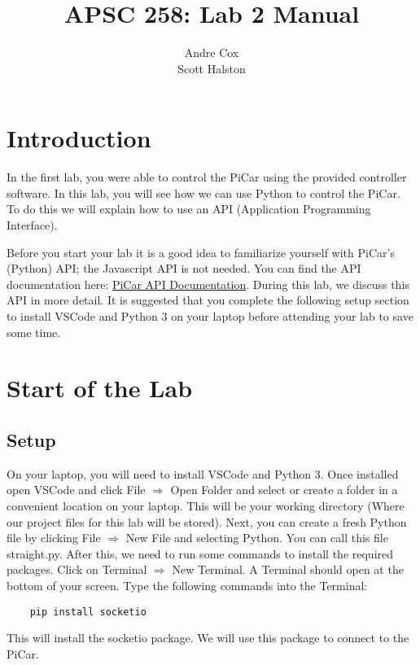 \documentclass[12pt]{report}
\title{APSC 258: Lab 2 Manual}
\author{Andre Cox \\ Scott Halston}
\begin{document}
\maketitle
\tableofcontents

\clearpage

\chapter{Introduction}
In the first lab, you were able to control the PiCar using the provided controller software. In this lab, you will see how we can use Python to control the PiCar. To do this we will explain how to use an API (Application Programming Interface).


Before you start your lab it is a good idea to familiarize yourself with PiCar's (Python) API; the Javascript API is not needed. You can find the API documentation here:
\href{https://github.com/PiCarV/Car-Software/wiki/Pi-Car-V-API-Documentation}{PiCar
    API Documentation}. During this lab, we discuss this API in more detail. It is suggested that you complete the following setup section to install VSCode and Python 3 on your laptop before attending your lab to save some time.

\chapter{Start of the Lab}
\section{Setup}
On your laptop, you will need to install VSCode and Python 3. Once installed open VSCode and click File $\Rightarrow$ Open Folder and select or create a folder in a convenient location on your laptop. This will be your working directory (Where our project files for this lab will be stored). Next, you can create a fresh Python file by clicking File $\Rightarrow$ New File and selecting Python. You can call this file straight.py. After this, we need to run some commands to install the required packages. Click on Terminal $\Rightarrow$ New Terminal. A Terminal should open at the bottom of your screen. Type the following commands into the Terminal:
\begin{verbatim}
    pip install socketio 
    \end{verbatim}
This will install the socketio package. We will use this package to connect to the PiCar.
\end{document}
